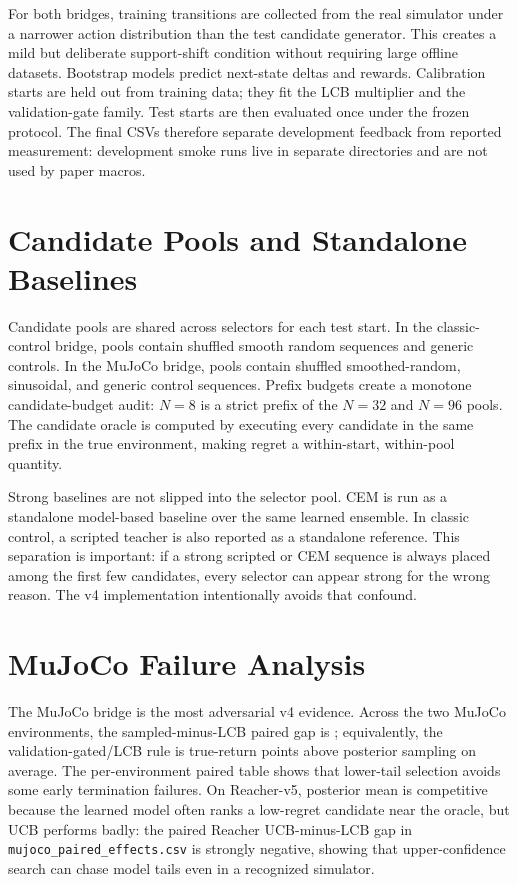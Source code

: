 \documentclass{article}
\begin{document}
For both bridges, training transitions are collected from the real simulator
under a narrower action distribution than the test candidate generator. This
creates a mild but deliberate support-shift condition without requiring large
offline datasets. Bootstrap models predict next-state deltas and rewards.
Calibration starts are held out from training data; they fit the LCB multiplier
and the validation-gate family. Test starts are then evaluated once under the
frozen protocol. The final CSVs therefore separate development feedback from
reported measurement: development smoke runs live in separate directories and
are not used by paper macros.

\section{Candidate Pools and Standalone Baselines}

Candidate pools are shared across selectors for each test start. In the
classic-control bridge, pools contain shuffled smooth random sequences and
generic controls. In the MuJoCo bridge, pools contain shuffled smoothed-random,
sinusoidal, and generic control sequences. Prefix budgets create a monotone
candidate-budget audit: $N=8$ is a strict prefix of the $N=32$ and
$N=96$ pools. The candidate oracle is computed by executing every candidate in
the same prefix in the true environment, making regret a within-start,
within-pool quantity.

Strong baselines are not slipped into the selector pool. CEM is run as a
standalone model-based baseline over the same learned ensemble. In classic
control, a scripted teacher is also reported as a standalone reference. This
separation is important: if a strong scripted or CEM sequence is always placed
among the first few candidates, every selector can appear strong for the wrong
reason. The v4 implementation intentionally avoids that confound.

\section{MuJoCo Failure Analysis}

The MuJoCo bridge is the most adversarial v4 evidence. Across the two MuJoCo
environments, the sampled-minus-LCB paired gap is
\VFourMujocoSampleLCBGap{}; equivalently, the validation-gated/LCB rule is
\VFourMujocoGateSampleGap{} true-return points above posterior sampling on
average. The per-environment paired table shows that lower-tail selection
avoids some early termination failures. On Reacher-v5, posterior mean is competitive
because the learned model often ranks a low-regret candidate near the oracle,
but UCB performs badly: the paired Reacher UCB-minus-LCB gap in
\texttt{mujoco\_paired\_effects.csv} is strongly negative, showing that
upper-confidence search can chase model tails even in a recognized simulator.
\end{document}

